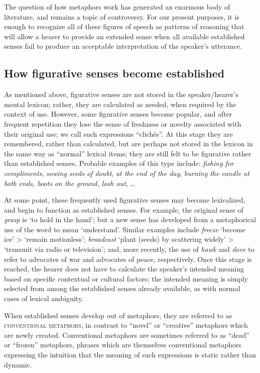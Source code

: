 The question of how metaphors work has generated an enormous body of literature, and remains a topic of controversy. For our present purposes, it is enough to recognize all of these figures of speech as patterns of reasoning that will allow a hearer to provide an extended sense when all available established senses fail to produce an acceptable interpretation of the speaker’s utterance.


\subsection{How figurative senses become established}\label{sec:5.4.2}

As mentioned above, figurative senses are not stored in the speaker/hearer’s mental lexicon; rather, they are calculated as needed, when required by the context of use. However, some figurative senses become popular, and after frequent repetition they lose the sense of freshness or novelty associated with their original use; we call such expressions “clichés”. At this stage they are remembered, rather than calculated, but are perhaps not stored in the lexicon in the same way as “normal” lexical items; they are still felt to be figurative rather than established senses. Probable examples of this type include: \textit{fishing for compliments}, \textit{sowing seeds of doubt}, \textit{at the end of the day}, \textit{burning the candle at both ends, boots on the ground, lash out,} …


At some point, these frequently used figurative senses may become lexicalized, and begin to function as established senses. For example, the original sense of \textit{grasp} is ‘to hold in the hand’; but a new sense has developed from a metaphorical use of the word to mean ‘understand’. Similar examples include \textit{freeze} ‘become ice’ > ‘remain motionless’; \textit{broadcast} ‘plant (seeds) by scattering widely’ > ‘transmit via radio or television’; and, more recently, the use of \textit{hawk} and \textit{dove} to refer to advocates of war and advocates of peace, respectively. Once this stage is reached, the hearer does not have to calculate the speaker’s intended meaning based on specific contextual or cultural factors; the intended meaning is simply selected from among the established senses already available, as with normal cases of lexical ambiguity.



When established senses develop out of metaphors, they are referred to as \textsc{conventional metaphors}, in contrast to “novel” or “creative” metaphors which are newly created. Conventional metaphors are sometimes referred to as “dead” or “frozen” metaphors, phrases which are themselves conventional metaphors expressing the intuition that the meaning of such expressions is static rather than dynamic.



